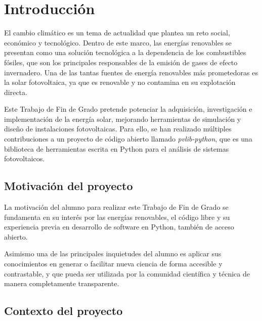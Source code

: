\chapter{Introducción} \label{chp:intro}

El cambio climático es un tema de actualidad que plantea un reto social, económico y tecnológico. Dentro de este marco, las energías renovables se presentan como una solución tecnológica a la dependencia de los combustibles fósiles, que son los principales responsables de la emisión de gases de efecto invernadero. Una de las tantas fuentes de energía renovables más prometedoras es la solar fotovoltaica, ya que es renovable y no contamina en su explotación directa.

Este Trabajo de Fin de Grado pretende potenciar la adquisición, investigación e implementación de la energía solar, mejorando herramientas de simulación y diseño de instalaciones fotovoltaicas. Para ello, se han realizado múltiples contribuciones a un proyecto de código abierto llamado \textit{pvlib-python}, que es una biblioteca de herramientas escrita en Python para el análisis de sistemas fotovoltaicos.


\section{Motivación del proyecto} \label{sct:intro:motivacion}

La motivación del alumno para realizar este Trabajo de Fin de Grado se fundamenta en su interés por las energías renovables, el código libre y su experiencia previa en desarrollo de software en Python, también de acceso abierto.

Asimismo una de las principales inquietudes del alumno es aplicar sus conocimientos en generar o facilitar nueva ciencia de forma accesible y contrastable, y que pueda ser utilizada por la comunidad científica y técnica de manera completamente transparente.


\section{Contexto del proyecto} \label{sct:intro:contexto}

